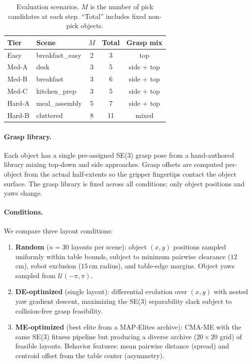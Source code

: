\documentclass[letterpaper, 10pt, conference]{ieeeconf}
\begin{document}
\begin{table}[t]
\centering
\caption{Evaluation scenarios.  $M$ is the number of pick candidates
at each step.  ``Total'' includes fixed non-pick objects.}
\label{tab:scenarios}
\small
\begin{tabular}{@{}llccc@{}}
\toprule
\textbf{Tier} & \textbf{Scene} & $M$ & \textbf{Total} & \textbf{Grasp mix} \\
\midrule
Easy   & breakfast\_easy  & 2 & 3  & top \\
Med-A  & desk             & 3 & 5  & side + top \\
Med-B  & breakfast        & 3 & 6  & side + top \\
Med-C  & kitchen\_prep    & 3 & 5  & side + top \\
Hard-A & meal\_assembly   & 5 & 7  & side + top \\
Hard-B & cluttered        & 8 & 11 & mixed \\
\bottomrule
\end{tabular}
\end{table}

\paragraph{Grasp library.}
Each object has a single pre-assigned SE(3) grasp pose from a
hand-authored library mixing top-down and side approaches.  Grasp
offsets are computed per-object from the actual half-extents so
the gripper fingertips contact the object surface.  The grasp
library is fixed across all conditions; only object positions and
yaws change.

\paragraph{Conditions.}
We compare three layout conditions:
\begin{enumerate}
  \item \textbf{Random} ($n{=}30$ layouts per scene): object
    $(x,y)$ positions sampled uniformly within table bounds,
    subject to minimum pairwise clearance ($12$\,cm), robot
    exclusion ($15$\,cm radius), and table-edge margins.  Object
    yaws sampled from $\mathcal{U}(-\pi, \pi)$.
  \item \textbf{DE-optimized} (single layout): differential
    evolution over $(x,y)$ with nested yaw gradient descent,
    maximizing the SE(3) separability slack subject to collision-free
    grasp feasibility.
  \item \textbf{ME-optimized} (best elite from a MAP-Elites
    archive): CMA-ME with the same SE(3) fitness pipeline but
    producing a diverse archive ($20 {\times} 20$ grid) of feasible
    layouts.  Behavior features: mean pairwise distance (spread)
    and centroid offset from the table center (asymmetry).
\end{enumerate}
\end{document}
